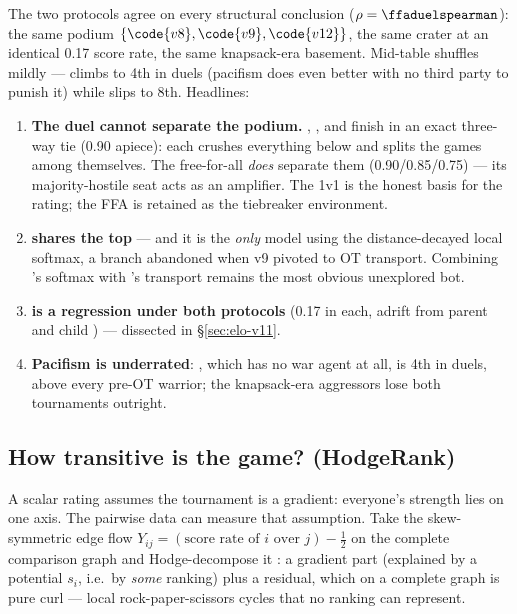 The two protocols agree on every structural conclusion
($\rho = \ffaduelspearman$): the same podium
$\{\code{v8}, \code{v9}, \code{v12}\}$, the same  crater at an
identical 0.17 score rate, the same knapsack-era basement. Mid-table shuffles
mildly ---  climbs to 4th in duels (pacifism does even
better with no third party to punish it) while  slips to 8th.
Headlines:

\begin{enumerate}
  \item \textbf{The duel cannot separate the podium.} , ,
    and  finish in an exact three-way tie (0.90 apiece): each
    crushes everything below and splits the games among themselves. The
    free-for-all \emph{does} separate them (0.90/0.85/0.75) --- its
    majority-hostile seat acts as an amplifier. The 1v1 is the honest basis
    for the rating; the FFA is retained as the tiebreaker environment.
  \item \textbf{ shares the top} --- and it is the \emph{only} model
    using the distance-decayed local softmax, a branch abandoned when v9
    pivoted to OT transport. Combining 's softmax with 's
    transport remains the most obvious unexplored bot.
  \item \textbf{ is a regression under both protocols} (0.17 in
    each, adrift from parent  and child ) --- dissected
    in \S\ref{sec:elo-v11}.
  \item \textbf{Pacifism is underrated}: , which has no
    war agent at all, is 4th in duels, above every pre-OT warrior; the
    knapsack-era aggressors lose both tournaments outright.
\end{enumerate}

\subsection{How transitive is the game? (HodgeRank)}
\label{sec:elo-hodge}

A scalar rating assumes the tournament is a gradient: everyone's strength
lies on one axis. The pairwise data can measure that assumption. Take the
skew-symmetric edge flow $Y_{ij} = (\text{score rate of } i \text{ over }
j) - \tfrac12$ on the complete comparison graph and Hodge-decompose it
\citep{jiang2011}: a gradient part (explained by a potential $s_i$, i.e.\ by
\emph{some} ranking) plus a residual, which on a complete graph is pure curl
--- local rock-paper-scissors cycles that no ranking can represent.

